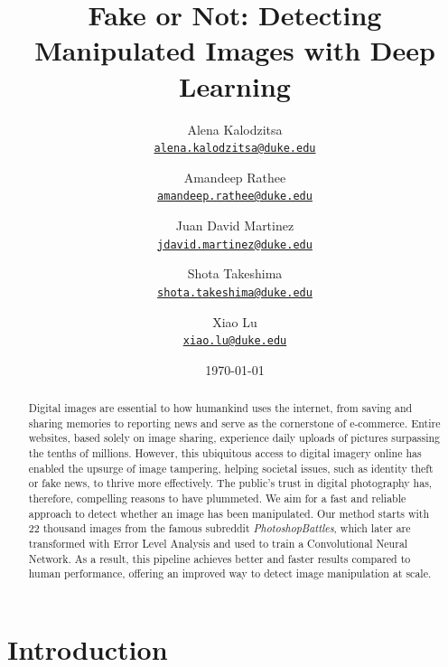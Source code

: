 \documentclass[11pt]{article}
\title{Fake or Not: Detecting Manipulated Images with Deep Learning}
\author{Alena Kalodzitsa\\%
    \href{mailto:alena.kalodzitsa@duke.edu}{\texttt{alena.kalodzitsa@duke.edu}} %
\and Amandeep Rathee\\%
    \href{mailto:amandeep.rathee@duke.edu}{\texttt{amandeep.rathee@duke.edu}} %
\and Juan David Martinez\\%
    \href{mailto:jdavid.martinez@duke.edu}{\texttt{jdavid.martinez@duke.edu}}%
\and  Shota Takeshima\\%
    \href{mailto:shota.takeshima@duke.edu}{\texttt{shota.takeshima@duke.edu}}%
\and  Xiao Lu\\%
    \href{mailto:xiao.lu@duke.edu}{\texttt{xiao.lu@duke.edu}}%
    }
\date{\today}
\begin{document}
{
\maketitle
\begin{abstract}

Digital images are essential to how humankind uses the internet, from saving and sharing memories to reporting news and serve as the cornerstone of e-commerce. Entire websites, based solely on image sharing, experience daily uploads of pictures surpassing the tenths of millions. However, this ubiquitous access to digital imagery online has enabled the upsurge of image tampering, helping societal issues, such as identity theft or fake news, to thrive more effectively. The public's trust in digital photography has, therefore, compelling reasons to have plummeted. We aim for a fast and reliable approach to detect whether an image has been manipulated. Our method starts with 22 thousand images from the famous subreddit {\it PhotoshopBattles}, which later are transformed with Error Level Analysis and used to train a Convolutional Neural Network. As a result, this pipeline achieves better and faster results compared to human performance, offering an improved way to detect image manipulation at scale.

\end{abstract}
}


\section{Introduction}
\end{document}
